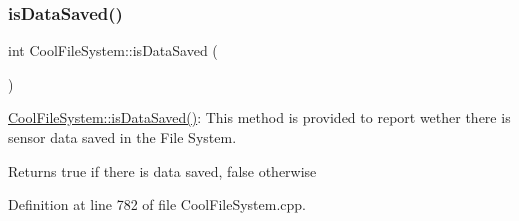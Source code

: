\subsubsection{\texorpdfstring{is\+Data\+Saved()}{isDataSaved()}}
{\footnotesize\ttfamily int Cool\+File\+System\+::is\+Data\+Saved (\begin{DoxyParamCaption}{ }\end{DoxyParamCaption})}

\hyperlink{class_cool_file_system_ac86a40e7c3a1842f7342f698d34324f9}{Cool\+File\+System\+::is\+Data\+Saved()}\+: This method is provided to report wether there is sensor data saved in the File System.

\begin{DoxyReturn}{Returns}
true if there is data saved, false otherwise 
\end{DoxyReturn}


Definition at line 782 of file Cool\+File\+System.\+cpp.


